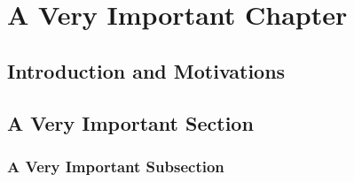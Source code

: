 \documentclass[draft]{phd}
\begin{document}
	\chapter{A Very Important Chapter}
	\label{chapbrane}

			\section{Introduction and Motivations}

			\section{A Very Important Section}
            	\subsection{A Very Important Subsection}

\end{document}
